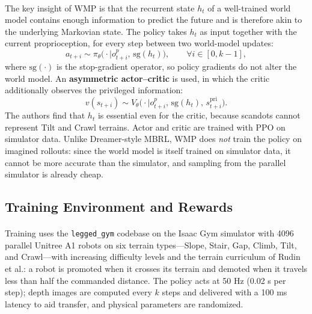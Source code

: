 \documentclass[12pt,a4paper,final]{extreport}
\begin{document}
\paragraph{} The key insight of WMP is that the recurrent state $h_t$ of a well-trained world model contains enough information to predict the future and is therefore akin to the underlying Markovian state. The policy takes $h_t$ as input together with the current proprioception, for every step between two world-model updates:
\begin{equation}
a_{t+i}\sim\pi_\theta\big(\cdot\mid o^p_{t+i},\,\mathrm{sg}(h_t)\big),\qquad \forall i\in[0,k-1],
\end{equation}
where $\mathrm{sg}(\cdot)$ is the stop-gradient operator, so policy gradients do not alter the world model. An \textbf{asymmetric actor--critic} is used, in which the critic additionally observes the privileged information:
\begin{equation}
v(s_{t+i})\sim V_\theta\big(\cdot\mid o^p_{t+i},\,\mathrm{sg}(h_t),\,s^{\mathrm{pri}}_{t+i}\big).
\end{equation}
The authors find that $h_t$ is essential even for the critic, because scandots cannot represent Tilt and Crawl terrains. Actor and critic are trained with PPO on simulator data. Unlike Dreamer-style MBRL, WMP does \emph{not} train the policy on imagined rollouts: since the world model is itself trained on simulator data, it cannot be more accurate than the simulator, and sampling from the parallel simulator is already cheap.

\subsection{Training Environment and Rewards}

\paragraph{} Training uses the \texttt{legged\_gym} codebase on the Isaac Gym simulator with 4096 parallel Unitree A1 robots on six terrain types---Slope, Stair, Gap, Climb, Tilt, and Crawl---with increasing difficulty levels and the terrain curriculum of Rudin et al.: a robot is promoted when it crosses its terrain and demoted when it travels less than half the commanded distance. The policy acts at 50 Hz (0.02 s per step); depth images are computed every $k$ steps and delivered with a 100 ms latency to aid transfer, and physical parameters are randomized.
\end{document}
